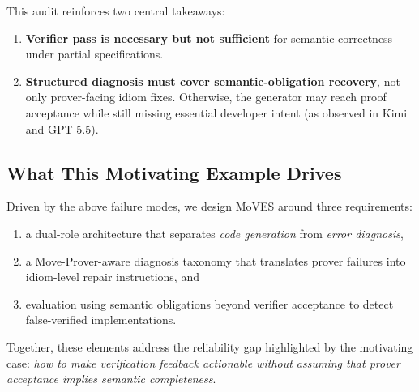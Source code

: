 This audit reinforces two central takeaways:
\begin{enumerate}
    \item \textbf{Verifier pass is necessary but not sufficient} for semantic correctness under partial specifications.
    \item \textbf{Structured diagnosis must cover semantic-obligation recovery}, not only prover-facing idiom fixes.
    Otherwise, the generator may reach proof acceptance while still missing essential developer intent (as observed in Kimi and GPT 5.5).
\end{enumerate}

\subsection{What This Motivating Example Drives}

Driven by the above failure modes, we design MoVES around three requirements:
\begin{enumerate}
    \item a dual-role architecture that separates \emph{code generation} from \emph{error diagnosis},
    \item a Move-Prover-aware diagnosis taxonomy that translates prover failures into idiom-level repair instructions, and
    \item evaluation using semantic obligations beyond verifier acceptance to detect false-verified implementations.
\end{enumerate}

Together, these elements address the reliability gap highlighted by the motivating case: \emph{how to make verification feedback actionable without assuming that prover acceptance implies semantic completeness}.
